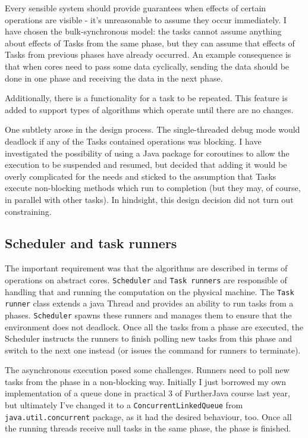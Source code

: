\documentclass[12pt,a4paper,twoside,openright]{report}
\begin{document}
Every sensible system should provide guarantees when effects of certain operations are visible - it's unreasonable to assume they occur immediately. I have chosen the bulk-synchronous model: the tasks cannot assume anything about effects of Tasks from the same phase, but they can assume that effects of Tasks from previous phases have already occurred. An example consequence is that when cores need to pass some data cyclically, sending the data should be done in one phase and receiving the data in the next phase.

Additionally, there is a functionality for a task to be repeated. This feature is added to support types of algorithms which operate until there are no changes.

One subtlety arose in the design process. The single-threaded debug mode would deadlock if any of the Tasks contained operations was blocking. I have investigated the possibility of using a Java package for coroutines to allow the execution to be suspended and resumed, but decided that adding it would be overly complicated for the needs and sticked to the assumption that Tasks execute non-blocking methods which run to completion (but they may, of course, in parallel with other tasks). In hindsight, this design decision did not turn out constraining.

\subsection{Scheduler and task runners}
The important requirement was that the algorithms are described in terms of operations on abstract cores. \texttt{Scheduler} and \texttt{Task runners} are responsible of handling that and running the computation on the physical machine. The \texttt{Task runner} class extends a java Thread and provides an ability to run tasks from a phases. \texttt{Scheduler} spawns these runners and manages them to ensure that the environment does not deadlock. Once all the tasks from a phase are executed, the Scheduler instructs the runners to finish polling new tasks from this phase and switch to the next one instead (or issues the command for runners to terminate).

The asynchronous execution posed some challenges. Runners need to poll new tasks from the phase in a non-blocking way. Initially I just borrowed my own implementation of a queue done in practical 3 of FurtherJava course last year, but ultimately I've changed it to a  \texttt{ConcurrentLinkedQueue} from \texttt{java.util.concurrent} package, as it had the desired behaviour, too. Once all the running threads receive null tasks in the same phase, the phase is finished.
\end{document}
